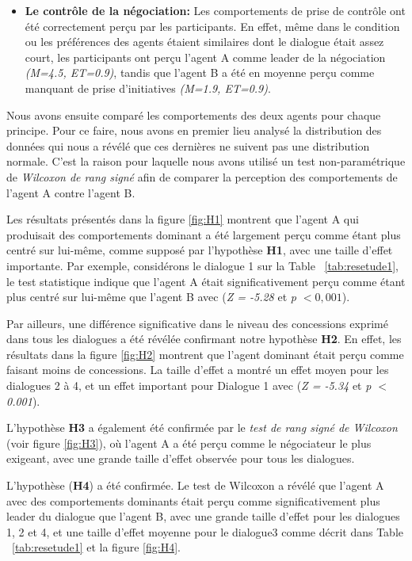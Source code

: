{\begin{itemize}
							\item  \textbf{Le contrôle de la négociation:} Les comportements de prise de contrôle ont été correctement perçu par les participants. En effet, même dans le condition ou les préférences des agents étaient similaires dont le dialogue était assez court, les participants ont perçu l'agent A comme leader de la négociation \textit{(M=4.5, ET=0.9)}, tandis que l'agent B a été en moyenne perçu comme manquant de prise d'initiatives \textit{(M=1.9, ET=0.9)}.
					\end{itemize}
				
			Nous avons ensuite comparé les comportements des deux agents pour chaque principe. Pour ce faire, nous avons en premier lieu analysé la distribution des données qui nous a révélé que ces dernières ne suivent pas une distribution normale. C'est la raison pour laquelle nous avons utilisé un test non-paramétrique de \emph{Wilcoxon  de rang signé} afin de comparer la perception des comportements de l'agent A contre l'agent B.
			
			Les résultats présentés dans la figure \ref{fig:H1} montrent que l'agent A qui produisait des comportements dominant a été largement perçu comme étant plus centré sur lui-même, comme supposé par l'hypothèse \textbf {H1}, avec une taille d'effet importante. Par exemple, considérons le dialogue 1 sur la Table ~\ref {tab:resetude1}, le test statistique indique que l'agent A était significativement perçu comme étant plus centré sur lui-même que l'agent B avec (\emph {Z = -5.28} et  \emph {p $ <0,001 $}).
			
			Par ailleurs, une différence significative dans le niveau des concessions exprimé dans tous les dialogues a été révélée confirmant notre hypothèse \textbf {H2}. En effet, les résultats dans la figure \ref{fig:H2} montrent que l'agent dominant était perçu comme faisant moins de concessions. La taille d'effet a montré un effet moyen pour les dialogues 2 à 4, et un effet important pour Dialogue 1 avec (\emph {Z = -5.34} et \emph {p $ <$ 0.001}).
			
			L'hypothèse \textbf {H3} a également été confirmée par le \emph {test de rang signé de Wilcoxon} (voir figure \ref{fig:H3}), où l'agent A a été perçu comme le négociateur le plus exigeant, avec une grande taille d'effet observée pour tous les dialogues. 
			
			L'hypothèse (\textbf {H4}) a été confirmée. Le test de Wilcoxon a révélé que l'agent A avec des comportements dominants  était perçu comme significativement plus leader du dialogue que l'agent B, avec une grande taille d'effet pour les dialogues 1, 2 et 4, et une taille d'effet moyenne pour le dialogue3 comme décrit dans Table ~\ref {tab:resetude1} et la figure \ref{fig:H4}.

}
